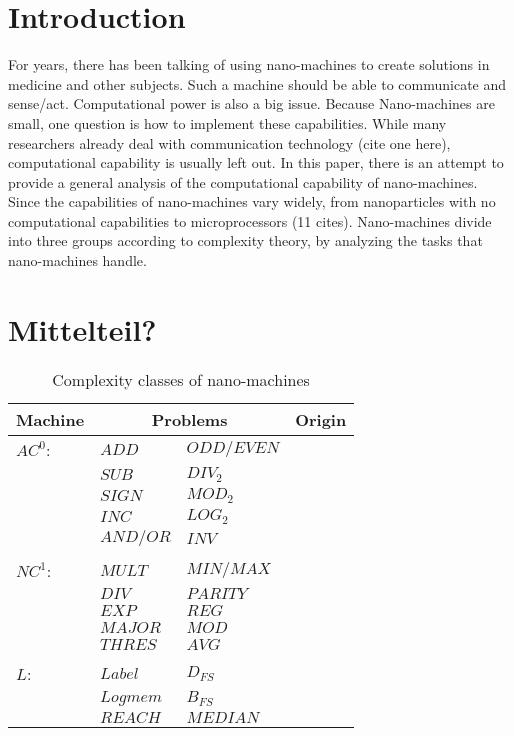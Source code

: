 \documentclass[10pt,sigconf]{acmart}
\begin{document}
\section{Introduction}
For years, there has been talking of using nano-machines to create solutions in medicine and other subjects. Such a machine should be able to communicate and sense/act. Computational power is also a big issue.
Because Nano-machines are small, one question is how to implement these capabilities. 
While many researchers already deal with communication technology (cite one here), computational capability is usually left out.
In this paper, there is an attempt to provide a general analysis of the computational capability of nano-machines.
Since the capabilities of nano-machines vary widely, from nanoparticles with no computational capabilities to microprocessors (11 cites). Nano-machines divide into three groups according to complexity theory,
by analyzing the tasks that nano-machines handle.



\section{Mittelteil?}
\begin{table}[h!]
  \begin{tabular}{ p{1.5cm}|p{2cm} p{2cm}|p{1.5cm} }
    \hline
    Machine & \multicolumn{2}{c|}{Problems}  & Origin\\
    \hline
    $AC^0$: & $ADD$ & $ODD/EVEN$&  \\
            & $SUB$ & $DIV_{2}$&  \\
            & $SIGN$ & $MOD_{2}$&  \\
            & $INC$ & $LOG_{2}$&  \\
            & $AND/OR$ & $INV$&  \\
            &  & &  \\
    $NC^1$:   & $MULT$ &$MIN/MAX$   & \\
             & $DIV$ & $PARITY$&  \\
             & $EXP$ & $REG$&  \\
             & $MAJOR$ & $MOD$&  \\
             & $THRES$ & $AVG$&  \\
             &  & &  \\
    $L$:      &   $Label$ &$D_{FS}$ &     \\
             & $Log mem$ & $B_{FS}$&  \\
             & $REACH$ & $MEDIAN$&  \\
            
    \hline 
  \end{tabular}\\
    
  \caption{Complexity classes of nano-machines}
  \label{table1}
\end{table}
\end{document}
